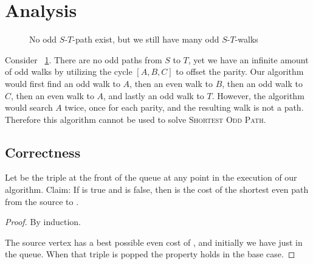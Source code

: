 \section{Analysis}

\begin{figure}
    \centering
    
    \caption{No odd $S$-$T$-path exist, but we still have many odd $S$-$T$-walks}
    \label{small2}
\end{figure}

Consider ~\ref{small2}. There are no odd paths from $S$ to $T$, yet we have an infinite amount of odd walks by utilizing the cycle $[A,B,C]$ to offset the parity. Our algorithm would first find an odd walk to $A$, then an even walk to $B$, then an odd walk to $C$, then an even walk to $A$, and lastly an odd walk to $T$. However, the algorithm would search $A$ twice, once for each parity, and the resulting walk is not a path. Therefore this algorithm cannot be used to solve \textsc{Shortest Odd Path}.

\subsection{Correctness}
Let  be the triple at the front of the queue at any point in the execution of our algorithm.
Claim: If  is true and  is false, then  is the cost of the shortest even path from the source to .

\begin{proof}
By induction. 

The source vertex  has a best possible even cost of , and initially we have just  in the queue. When that triple is popped the property holds in the base case.


\end{proof}

